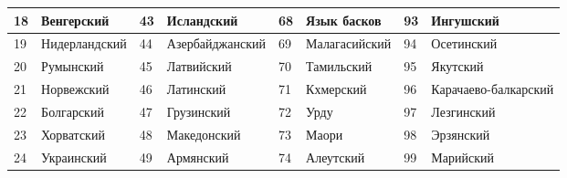\documentclass[12pt, twoside]{article}
\begin{document}
\begin{table}[H]
\begin{tabular}{|l|l|l|l|l|l|l|l|}
18 & Венгерский    & 43 & Исландский       & 68 & Язык басков   & 93 & Ингушский            \\ \hline
19 & Нидерландский & 44 & Азербайджанский  & 69 & Малагасийский & 94 & Осетинский           \\ \hline
20 & Румынский     & 45 & Латвийский       & 70 & Тамильский    & 95 & Якутский             \\ \hline
21 & Норвежский    & 46 & Латинский        & 71 & Кхмерский     & 96 & Карачаево-балкарский \\ \hline
22 & Болгарский    & 47 & Грузинский       & 72 & Урду          & 97 & Лезгинский           \\ \hline
23 & Хорватский    & 48 & Македонский      & 73 & Маори         & 98 & Эрзянский            \\ \hline
24 & Украинский    & 49 & Армянский        & 74 & Алеутский     & 99 & Марийский            \\ \hline
\end{tabular}
\end{table}
\end{document}
